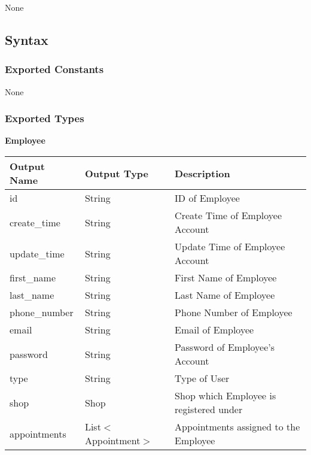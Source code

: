 \documentclass[12pt, titlepage]{article}
\begin{document}
None

\subsection{Syntax}

\subsubsection{Exported Constants}

None

\subsubsection{Exported Types}

\textbf{Employee}

\begin{table}[H]
	\begin{tabular}{|l|l|l|}
		\hline
		\textbf{Output Name} & \textbf{Output Type}  & \textbf{Description}                    \\
		\hline
		id                   & String                & ID of Employee                          \\
		\hline
		create\_time         & String                & Create Time of Employee Account         \\
		\hline
		update\_time         & String                & Update Time of Employee Account         \\
		\hline
		first\_name          & String                & First Name of Employee                  \\
		\hline
		last\_name           & String                & Last Name of Employee                   \\
		\hline
		phone\_number        & String                & Phone Number of Employee                \\
		\hline
		email                & String                & Email of Employee                       \\
		\hline
		password             & String                & Password of Employee's Account          \\
		\hline
		type                 & String                & Type of User                            \\
		\hline
		shop                 & Shop                  & Shop which Employee is registered under \\
		\hline
		appointments         & List$<$Appointment$>$ & Appointments assigned to the Employee   \\
		\hline
	\end{tabular}
\end{table}
\end{document}
